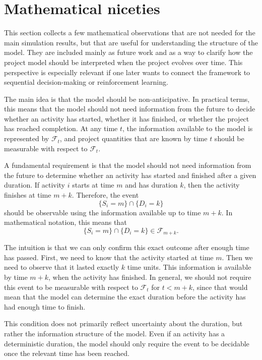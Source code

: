 \documentclass[11pt,a4paper]{article}
\newcommand{\cF}{\mathcal{F}}
\newcommand{\1}{\mathbf{1}}
\theoremstyle{definition}
\theoremstyle{plain}
\theoremstyle{remark}
\numberwithin{equation}{section}
\begin{document}
\section{Mathematical niceties}

This section collects a few mathematical observations that are not needed for the main simulation results, but that are useful for understanding the structure of the model. They are included mainly as future work and as a way to clarify how the project model should be interpreted when the project evolves over time. This perspective is especially relevant if one later wants to connect the framework to sequential decision-making or reinforcement learning.

The main idea is that the model should be non-anticipative. In practical terms, this means that the model should not need information from the future to decide whether an activity has started, whether it has finished, or whether the project has reached completion. At any time $t$, the information available to the model is represented by $\cF_t$, and project quantities that are known by time $t$ should be measurable with respect to $\cF_t$.

A fundamental requirement is that the model should not need information from the future to determine whether an activity has started and finished after a given duration. If activity $i$ starts at time $m$ and has duration $k$, then the activity finishes at time $m+k$. Therefore, the event
\[
\{S_i=m\}\cap \{D_i = k\}
\]
should be observable using the information available up to time $m+k$. In mathematical notation, this means that
\[
\{S_i=m\}\cap \{D_i = k\} \in \cF_{m+k}.
\]

The intuition is that we can only confirm this exact outcome after enough time has passed. First, we need to know that the activity started at time $m$. Then we need to observe that it lasted exactly $k$ time units. This information is available by time $m+k$, when the activity has finished. In general, we should not require this event to be measurable with respect to $\cF_t$ for $t<m+k$, since that would mean that the model can determine the exact duration before the activity has had enough time to finish.

This condition does not primarily reflect uncertainty about the duration, but rather the information structure of the model. Even if an activity has a deterministic duration, the model should only require the event to be decidable once the relevant time has been reached.
\end{document}
